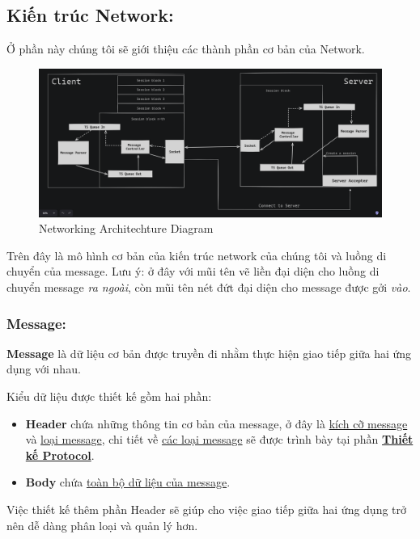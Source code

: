 \subsection{Kiến trúc Network: }
\label{sec:network-archi}
Ở phần này chúng tôi sẽ giới thiệu các thành phần cơ bản của Network. \\

\begin{figure}[H]
	\centering
	\includegraphics[width=\linewidth]{latex/architechture/architechture_diagram.png}
	\caption{Networking Architechture Diagram}
	\label{fig:network}
\end{figure}

Trên đây là mô hình cơ bản của kiến trúc network của chúng tôi và luồng di chuyển của message. Lưu ý: ở đây với mũi tên vẽ liền đại diện cho luồng di chuyển message \textit{ra ngoài}, còn mũi tên nét đứt đại diện cho message được gởi \textit{vào}.

\subsubsection{Message: }
\label{sec:message}
\textbf{Message} là dữ liệu cơ bản được truyền đi nhằm thực hiện giao tiếp giữa hai ứng dụng với nhau.

Kiểu dữ liệu được thiết kế gồm hai phần:
\begin{itemize}
	\item \textbf{Header} chứa những thông tin cơ bản của message, ở đây là \underline{kích cỡ message} và \underline{loại message}, chi tiết về \underline{các loại message} sẽ được trình bày tại phần 
	\textbf{\hyperref[subsec:Protocol]{Thiết kế Protocol}}.
	\item \textbf{Body} chứa \underline{toàn bộ dữ liệu của message}.
\end{itemize}

Việc thiết kế thêm phần Header sẽ giúp cho việc giao tiếp giữa hai ứng dụng trở nên dễ dàng phân loại và quản lý hơn.

